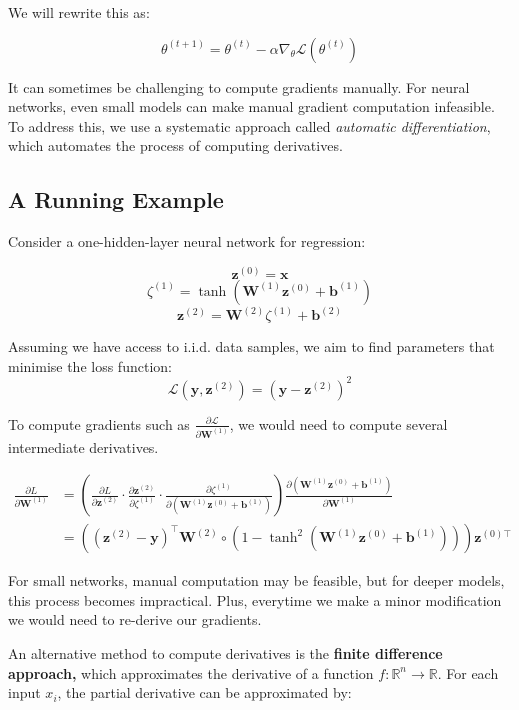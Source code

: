 We will rewrite this as:

\[\theta^{(t+1)}=\theta^{(t)}-\alpha\nabla_\theta\mathcal{L}(\theta^{(t)})\]

It can sometimes be challenging to compute gradients manually. For neural networks, even small models can make manual gradient computation infeasible. To address this, we use a systematic approach called \textit{automatic differentiation}, which automates the process of computing derivatives.

\subsection{A Running Example}

Consider a one-hidden-layer neural network for regression:

\[
    \bm{z}^{(0)} = \bm{x}
\]
\[
    \zeta^{(1)} = \tanh\left( \bm{W}^{(1)} \bm{z}^{(0)} + \bm{b}^{(1)} \right)
\]
\[
    \bm{z}^{(2)} = \bm{W}^{(2)} \zeta^{(1)} + \bm{b}^{(2)}
\]

Assuming we have access to i.i.d. data samples, we aim to find parameters that minimise the loss function:
\[
    \mathcal{L}(\bm{y}, \bm{z}^{(2)}) = \left( \bm{y} - \bm{z}^{(2)} \right)^2
\]

To compute gradients such as \( \frac{\partial \mathcal{L}}{\partial \bm{W}^{(1)}} \), we would need to compute several intermediate derivatives.

\[\begin{aligned}
        \frac{\partial L}{\partial\boldsymbol{W}^{(1)}} & =\left(\frac{\partial L}{\partial\boldsymbol{z}^{(2)}}\cdot\frac{\partial\boldsymbol{z}^{(2)}}{\partial\zeta^{(1)}}\cdot\frac{\partial\zeta^{(1)}}{\partial(\boldsymbol{W}^{(1)}\boldsymbol{z}^{(0)}+\boldsymbol{b}^{(1)})}\right)\frac{\partial(\boldsymbol{W}^{(1)}\boldsymbol{z}^{(0)}+\boldsymbol{b}^{(1)})}{\partial\boldsymbol{W}^{(1)}} \\
                                                        & =\left((\boldsymbol{z}^{(2)}-\boldsymbol{y})^\top\boldsymbol{W}^{(2)}\circ\left(1-\tanh^2(\boldsymbol{W}^{(1)}\boldsymbol{z}^{(0)}+\boldsymbol{b}^{(1)})\right)\right)\boldsymbol{z}^{(0)\top}
    \end{aligned}\]

For small networks, manual computation may be feasible, but for deeper models, this process becomes impractical. Plus, everytime we make a minor modification we would need to re-derive our gradients. \bigskip

An alternative method to compute derivatives is the\textbf{ finite difference approach,} which approximates the derivative of a function \( f : \mathbb{R}^n \to \mathbb{R} \). For each input \( x_i \), the partial derivative can be approximated by:

